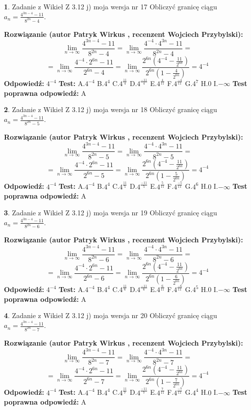 \documentclass[12pt, a4paper]{article}
\theoremstyle{definition} %
\newtheorem{zad}{}
\newcommand{\zadStart}[1]{\begin{zad}#1\newline}
\newcommand{\zadStop}{\end{zad}}
\newcommand{\rozwStart}[2]{\noindent \textbf{Rozwiązanie (autor #1 , recenzent #2): }\newline}
\newcommand{\rozwStop}{\newline}
\newcommand{\odpStart}{\noindent \textbf{Odpowiedź:}\newline}
\newcommand{\odpStop}{\newline}
\newcommand{\testStart}{\noindent \textbf{Test:}\newline}
\newcommand{\testStop}{\newline}
\newcommand{\kluczStart}{\noindent \textbf{Test poprawna odpowiedź:}\newline}
\newcommand{\kluczStop}{\newline}
\begin{document}
\zadStart{Zadanie z Wikieł Z 3.12 j) moja wersja nr 17}
Obliczyć granicę ciągu $a_{n}=\frac{4^{3n-4}-11}{8^{2n}-4}$.
\zadStop
\rozwStart{Patryk Wirkus}{Wojciech Przybylski}
$$\lim\limits_{n\to\infty}\frac{4^{3n-4}-11}{8^{2n}-4}= \lim\limits_{n\to\infty}\frac{4^{-4} \cdot 4^{3n}-11}{8^{2n}-4}=$$
$$= \lim\limits_{n\to\infty}\frac{4^{-4} \cdot 2^{6n}-11}{2^{6n}-4}= \lim\limits_{n\to\infty}\frac{2^{6n}(4^{-4} - \frac{11}{2^{6n}})}{2^{6n}(1-\frac{4}{2^{6n}})}= 4^{-4}$$
\rozwStop
\odpStart
$4^{-4}$
\odpStop
\testStart
A.$4^{-4}$
B.$4^{4}$
C.$4^{\frac{11}{4}}$
D.$4^{\frac{-11}{4}}$
E.$4^{\frac{4}{11}}$
F.$4^{\frac{-4}{11}}$
G.$4^{7}$
H.$0$
I.$-\infty$
\testStop
\kluczStart
A
\kluczStop



\zadStart{Zadanie z Wikieł Z 3.12 j) moja wersja nr 18}
Obliczyć granicę ciągu $a_{n}=\frac{4^{3n-4}-11}{8^{2n}-5}$.
\zadStop
\rozwStart{Patryk Wirkus}{Wojciech Przybylski}
$$\lim\limits_{n\to\infty}\frac{4^{3n-4}-11}{8^{2n}-5}= \lim\limits_{n\to\infty}\frac{4^{-4} \cdot 4^{3n}-11}{8^{2n}-5}=$$
$$= \lim\limits_{n\to\infty}\frac{4^{-4} \cdot 2^{6n}-11}{2^{6n}-5}= \lim\limits_{n\to\infty}\frac{2^{6n}(4^{-4} - \frac{11}{2^{6n}})}{2^{6n}(1-\frac{5}{2^{6n}})}= 4^{-4}$$
\rozwStop
\odpStart
$4^{-4}$
\odpStop
\testStart
A.$4^{-4}$
B.$4^{4}$
C.$4^{\frac{11}{5}}$
D.$4^{\frac{-11}{5}}$
E.$4^{\frac{5}{11}}$
F.$4^{\frac{-5}{11}}$
G.$4^{6}$
H.$0$
I.$-\infty$
\testStop
\kluczStart
A
\kluczStop



\zadStart{Zadanie z Wikieł Z 3.12 j) moja wersja nr 19}
Obliczyć granicę ciągu $a_{n}=\frac{4^{3n-4}-11}{8^{2n}-6}$.
\zadStop
\rozwStart{Patryk Wirkus}{Wojciech Przybylski}
$$\lim\limits_{n\to\infty}\frac{4^{3n-4}-11}{8^{2n}-6}= \lim\limits_{n\to\infty}\frac{4^{-4} \cdot 4^{3n}-11}{8^{2n}-6}=$$
$$= \lim\limits_{n\to\infty}\frac{4^{-4} \cdot 2^{6n}-11}{2^{6n}-6}= \lim\limits_{n\to\infty}\frac{2^{6n}(4^{-4} - \frac{11}{2^{6n}})}{2^{6n}(1-\frac{6}{2^{6n}})}= 4^{-4}$$
\rozwStop
\odpStart
$4^{-4}$
\odpStop
\testStart
A.$4^{-4}$
B.$4^{4}$
C.$4^{\frac{11}{6}}$
D.$4^{\frac{-11}{6}}$
E.$4^{\frac{6}{11}}$
F.$4^{\frac{-6}{11}}$
G.$4^{5}$
H.$0$
I.$-\infty$
\testStop
\kluczStart
A
\kluczStop



\zadStart{Zadanie z Wikieł Z 3.12 j) moja wersja nr 20}
Obliczyć granicę ciągu $a_{n}=\frac{4^{3n-4}-11}{8^{2n}-7}$.
\zadStop
\rozwStart{Patryk Wirkus}{Wojciech Przybylski}
$$\lim\limits_{n\to\infty}\frac{4^{3n-4}-11}{8^{2n}-7}= \lim\limits_{n\to\infty}\frac{4^{-4} \cdot 4^{3n}-11}{8^{2n}-7}=$$
$$= \lim\limits_{n\to\infty}\frac{4^{-4} \cdot 2^{6n}-11}{2^{6n}-7}= \lim\limits_{n\to\infty}\frac{2^{6n}(4^{-4} - \frac{11}{2^{6n}})}{2^{6n}(1-\frac{7}{2^{6n}})}= 4^{-4}$$
\rozwStop
\odpStart
$4^{-4}$
\odpStop
\testStart
A.$4^{-4}$
B.$4^{4}$
C.$4^{\frac{11}{7}}$
D.$4^{\frac{-11}{7}}$
E.$4^{\frac{7}{11}}$
F.$4^{\frac{-7}{11}}$
G.$4^{4}$
H.$0$
I.$-\infty$
\testStop
\kluczStart
A
\kluczStop
\end{document}

